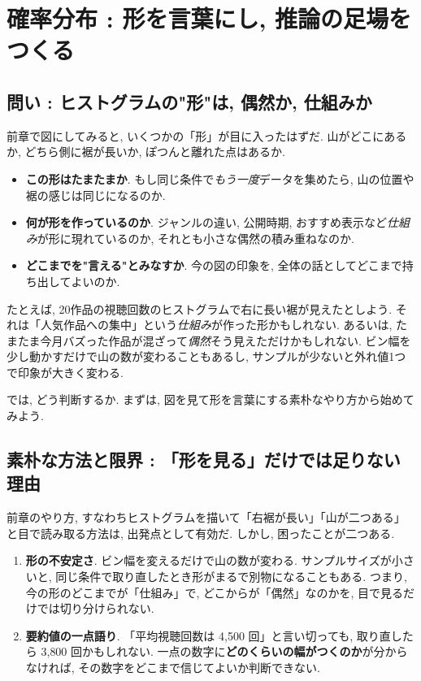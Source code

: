 ﻿\section{確率分布 : 形を言葉にし, 推論の足場をつくる}

  \subsection{問い : ヒストグラムの"形"は, 偶然か, 仕組みか}
    前章で図にしてみると, いくつかの「形」が目に入ったはずだ.
    山がどこにあるか, どちら側に裾が長いか, ぽつんと離れた点はあるか.

    \begin{itemize}
      \item \textbf{この形はたまたまか}. もし同じ条件で\textit{もう一度}データを集めたら, 山の位置や裾の感じは同じになるのか.
      \item \textbf{何が形を作っているのか}. ジャンルの違い, 公開時期, おすすめ表示など\textit{仕組み}が形に現れているのか, それとも小さな偶然の積み重ねなのか.
      \item \textbf{どこまでを"言える"とみなすか}. 今の図の印象を, 全体の話としてどこまで持ち出してよいのか.
    \end{itemize}

    たとえば, 20作品の視聴回数のヒストグラムで右に長い裾が見えたとしよう.
    それは「人気作品への集中」という\textit{仕組み}が作った形かもしれない.
    あるいは, たまたま今月バズった作品が混ざって\textit{偶然}そう見えただけかもしれない.
    ビン幅を少し動かすだけで山の数が変わることもあるし, サンプルが少ないと外れ値1つで印象が大きく変わる.

    では, どう判断するか. まずは, 図を見て形を言葉にする素朴なやり方から始めてみよう.

  \subsection{素朴な方法と限界 : 「形を見る」だけでは足りない理由}
    前章のやり方, すなわちヒストグラムを描いて「右裾が長い」「山が二つある」と目で読み取る方法は, 出発点として有効だ.
    しかし, 困ったことが二つある.

    \begin{enumerate}
      \item \textbf{形の不安定さ}. ビン幅を変えるだけで山の数が変わる. サンプルサイズが小さいと, 同じ条件で取り直したとき形がまるで別物になることもある.
            つまり, 今の形のどこまでが「仕組み」で, どこからが「偶然」なのかを, 目で見るだけでは切り分けられない.
      \item \textbf{要約値の一点語り}. 「平均視聴回数は 4{,}500 回」と言い切っても, 取り直したら 3{,}800 回かもしれない.
            一点の数字に\textbf{どのくらいの幅がつくのか}が分からなければ, その数字をどこまで信じてよいか判断できない.
    \end{enumerate}

